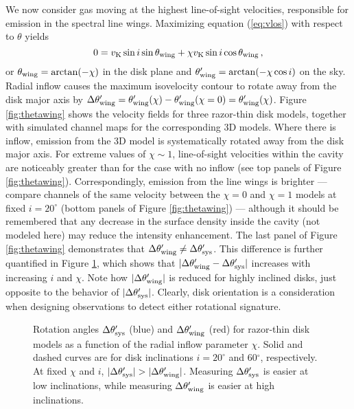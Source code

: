 We now consider gas moving at the highest line-of-sight velocities, responsible 
for emission in the spectral line wings.  Maximizing equation (\ref{eq:vlos}) 
with respect to $\theta$ yields
\begin{equation}
0=v_{\rm K}\sin i\sin\theta_{\rm wing}+\chi v_{\rm K}\sin i\cos\theta_{\rm wing} \,,
\label{eq:wingrot}
\end{equation}
or $\theta_{\rm wing} =\arctan(-\chi)$ in the disk plane and $\theta'_{\rm 
wing} = \arctan(-\chi \cos i)$ on the sky.  Radial inflow causes the maximum 
isovelocity contour to rotate away from the disk major axis by $\Delta 
\theta'_{\rm wing} = \theta'_{\rm wing} (\chi) - \theta'_{\rm wing} (\chi = 0) 
= \theta'_{\rm wing} (\chi)$.  Figure \ref{fig:thetawing} shows the velocity 
fields for three razor-thin disk models, together with simulated channel maps 
for the corresponding 3D models.  Where there is inflow, emission from the 3D 
model is systematically rotated away from the disk major axis.  For extreme 
values of $\chi \sim 1$, line-of-sight velocities within the cavity are 
noticeably greater than for the case with no inflow (see top panels of Figure 
\ref{fig:thetawing}).  Correspondingly, emission from the line wings is 
brighter --- compare channels of the same velocity between the $\chi = 0$ and 
$\chi = 1$ models at fixed $i = 20^\circ$ (bottom panels of Figure 
\ref{fig:thetawing}) --- although it should be remembered that any decrease in 
the surface density inside the cavity (not modeled here) may reduce the 
intensity enhancement.  The last panel of Figure \ref{fig:thetawing} 
demonstrates that $\Delta\theta'_{\rm wing} \neq \Delta\theta'_{\rm sys}$.  
This difference is further quantified in Figure \ref{fig:comparetheta}, which 
shows that $|\Delta\theta'_{\rm wing} -\Delta\theta'_{\rm sys}|$ increases with 
increasing $i$ and $\chi$.  Note how $|\Delta\theta'_{\rm wing}|$ is reduced 
for highly inclined disks, just opposite to the behavior of 
$|\Delta\theta'_{\rm sys}|$.  Clearly, disk orientation is a consideration when 
designing observations to detect either rotational signature.

\begin{figure}[t!]
\caption{Rotation angles $\Delta \theta'_{\rm sys}$ (blue) and $\Delta 
\theta'_{\rm wing}$ (red) for razor-thin disk models as a function of the 
radial inflow parameter $\chi$.  Solid and dashed curves are for disk 
inclinations $i = 20^\circ$ and 60$^\circ$, respectively.  At fixed $\chi$ and 
$i$, $|\Delta \theta'_{\rm sys}| > |\Delta \theta'_{\rm wing}|$.  Measuring 
$\Delta \theta'_{\rm sys}$ is easier at low inclinations, while measuring 
$\Delta \theta'_{\rm wing}$ is easier at high inclinations. 
\label{fig:comparetheta}}
\end{figure}

